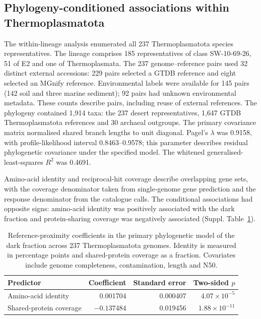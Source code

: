 \subsection*{Phylogeny-conditioned associations within Thermoplasmatota}
The within-lineage analysis enumerated all 237 Thermoplasmatota species representatives.
The lineage comprises 185 representatives of class SW-10-69-26, 51 of E2 and one of Thermoplasmata.
The 237 genome--reference pairs used 32 distinct external accessions: 229 pairs selected a GTDB
reference and eight selected an MGnify reference. Environmental labels were available for 145
pairs (142 soil and three marine sediment); 92 pairs had unknown environmental metadata.
These counts describe pairs, including reuse of external references. The phylogeny contained
1{,}914 taxa: the 237 desert representatives, 1{,}647 GTDB Thermoplasmatota references and 30
archaeal outgroups. The primary covariance matrix normalised shared branch lengths to unit
diagonal. Pagel's $\lambda$ was 0.9158, with profile-likelihood interval 0.8463--0.9578;
this parameter describes residual phylogenetic covariance under the specified model.
The whitened generalised-least-squares $R^2$ was 0.4691.

Amino-acid identity and reciprocal-hit coverage describe overlapping gene sets, with the
coverage denominator taken from single-genome gene prediction and the response denominator
from the catalogue calls. The conditional associations had opposite signs: amino-acid identity was positively associated with the dark fraction and protein-sharing coverage was negatively associated (Suppl. Table~\ref{tab:pgls}).

\begin{table}[ht]\centering\small
\caption{Reference-proximity coefficients in the primary phylogenetic model of the dark fraction across 237 Thermoplasmatota genomes. Identity is measured in percentage points and shared-protein coverage as a fraction. Covariates include genome completeness, contamination, length and N50.}\label{tab:pgls}
\begin{tabular}{lrrr}\toprule
Predictor & Coefficient & Standard error & Two-sided $p$\\\midrule
Amino-acid identity & 0.001704 & 0.000407 & $4.07\times10^{-5}$\\
Shared-protein coverage & $-0.137484$ & 0.019456 & $1.88\times10^{-11}$\\\bottomrule
\end{tabular}
\end{table}

